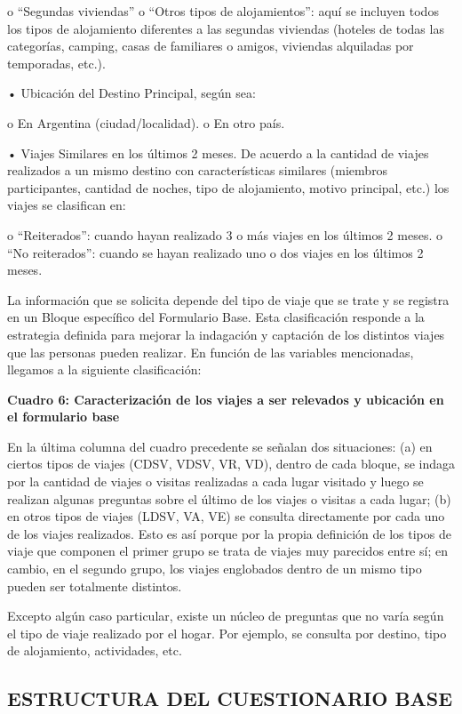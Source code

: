 \documentclass[
  openany]{book}
\begin{document}
o ``Segundas viviendas'' o ``Otros tipos de alojamientos'': aquí se incluyen todos los tipos de alojamiento diferentes a las segundas viviendas (hoteles de todas las categorías, camping, casas de familiares o amigos, viviendas alquiladas por temporadas, etc.).

• Ubicación del Destino Principal, según sea:

o En Argentina (ciudad/localidad).
o En otro país.

• Viajes Similares en los últimos 2 meses.
De acuerdo a la cantidad de viajes realizados a un mismo destino con características similares (miembros participantes, cantidad de noches, tipo de alojamiento, motivo principal, etc.) los viajes se clasifican en:

o ``Reiterados'': cuando hayan realizado 3 o más viajes en los últimos 2 meses.
o ``No reiterados'': cuando se hayan realizado uno o dos viajes en los últimos 2 meses.

La información que se solicita depende del tipo de viaje que se trate y se registra en un Bloque específico del Formulario Base.
Esta clasificación responde a la estrategia definida para mejorar la indagación y captación de los distintos viajes que las personas pueden realizar.
En función de las variables mencionadas, llegamos a la siguiente clasificación:

\textbf{Cuadro 6: Caracterización de los viajes a ser relevados y ubicación en el formulario base}

En la última columna del cuadro precedente se señalan dos situaciones: (a) en ciertos tipos de viajes (CDSV, VDSV, VR, VD), dentro de cada bloque, se indaga por la cantidad de viajes o visitas realizadas a cada lugar visitado y luego se realizan algunas preguntas sobre el último de los viajes o visitas a cada lugar; (b) en otros tipos de viajes (LDSV, VA, VE) se consulta directamente por cada uno de los viajes realizados.
Esto es así porque por la propia definición de los tipos de viaje que componen el primer grupo se trata de viajes muy parecidos entre sí; en cambio, en el segundo grupo, los viajes englobados dentro de un mismo tipo pueden ser totalmente distintos.

Excepto algún caso particular, existe un núcleo de preguntas que no varía según el tipo de viaje realizado por el hogar.
Por ejemplo, se consulta por destino, tipo de alojamiento, actividades, etc.

\hypertarget{estructura-del-cuestionario-base}{%
\subsection{\texorpdfstring{\textbf{ESTRUCTURA DEL CUESTIONARIO BASE}}{ESTRUCTURA DEL CUESTIONARIO BASE}}\label{estructura-del-cuestionario-base}}
\end{document}
